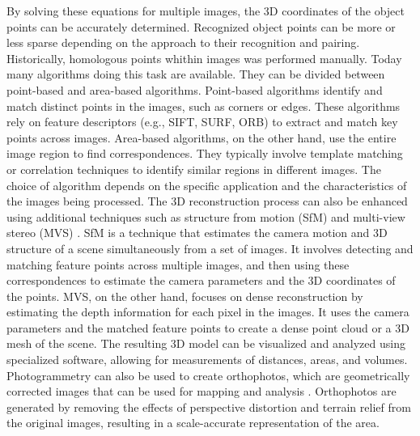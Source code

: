 \documentclass[12pt,a4paper,oneside]{report}
\begin{document}
By solving these equations for multiple images, the 3D coordinates of the object 
points can be accurately determined.
Recognized object points can be more or less sparse depending on the approach to 
their recognition and pairing. 
Historically, homologous points whithin images was
performed manually. Today many algorithms doing this task are available. 
They can be divided between point-based and area-based algorithms.
Point-based algorithms identify and match distinct points in the images, such as
corners or edges. These algorithms rely on feature descriptors (e.g., SIFT, SURF, ORB)
\cite{lowe_distinctive_2004, bay_surf_2008, rublee_orb_2011}
to extract and match key points across images. Area-based algorithms, on the other hand,
use the entire image region to find correspondences. They typically involve
template matching or correlation techniques to identify similar regions in different images.
The choice of algorithm depends on the specific application and the characteristics
of the images being processed.
The 3D reconstruction process can also be enhanced using additional techniques such as
structure from motion (SfM) and multi-view stereo (MVS)
\cite{westoby_structure-from-motion_2012, seitz_comparison_2006}. 
SfM is a technique that
estimates the camera motion and 3D structure of a scene simultaneously from a
set of images. It involves detecting and matching feature points across multiple images,
and then using these correspondences to estimate the camera parameters and the 3D
coordinates of the points. MVS, on the other hand, focuses on dense reconstruction
by estimating the depth information for each pixel in the images. It uses the camera
parameters and the matched feature points to create a dense point cloud or a 3D mesh
of the scene.
The resulting 3D model can be visualized and analyzed using specialized software,
allowing for measurements of distances, areas, and volumes. Photogrammetry can also
be used to create orthophotos, which are geometrically corrected images that can be
used for mapping and analysis
\cite{mikhail_introduction_2001, paine_aerial_2012}. 
Orthophotos are generated by removing the effects of
perspective distortion and terrain relief from the original images, resulting in a
scale-accurate representation of the area.
\end{document}
